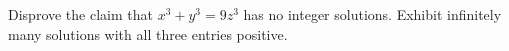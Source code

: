 Disprove the claim that $x^3+y^3=9z^3$ has no integer solutions. Exhibit infinitely many solutions with all three entries positive.
